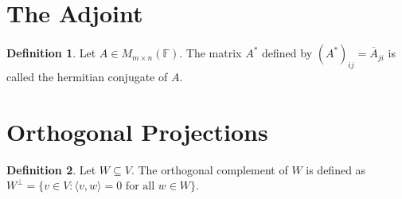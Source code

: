 \documentclass[oneside, 12pt]{book}
\theoremstyle{definition}
\newtheorem{defn}{Definition}[section]
\begin{document}
\section{The Adjoint}
\begin{defn}
  \label{defn_hermconj}
Let $A \in M_{m \times n}(\mathbb{F})$. The matrix $A^{*}$ defined by $(A^{*})_{ij}=\overline{A}_{ji}$ is called the hermitian conjugate of $A$.
\end{defn}
\section{Orthogonal Projections}
\begin{defn}
\label{orthcomp}
Let $W \subseteq V$. The orthogonal complement of $W$ is defined as $W^{\perp}=\{v \in V : \langle v, w \rangle=0 \text{ for all } w \in W\}$.
\end{defn}
\end{document}
